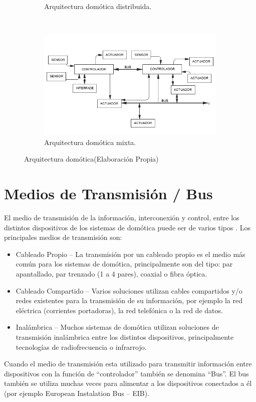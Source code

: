 \documentclass[11pt,letterpaper]{report}
\begin{document}
\begin{figure}
\begin{subfigure}[b]{0.5\textwidth}
        \caption{Arquitectura domótica distribuida. }
        \label{fig:distribuida}
    \end{subfigure}
     ~ %
    \begin{subfigure}[b]{0.5\textwidth}
        \includegraphics[width=\textwidth]{imagenes/MIXTA_.jpg}
        \caption{Arquitectura domótica mixta. }
        \label{fig:mixta}
    \end{subfigure}
    \caption{Arquitectura domótica(Elaboración Propia)}\label{fig:shelter}
\end{figure}
		\section{Medios de Transmisión / Bus}
		El medio de transmisión de la información, interconexión y control, entre los distintos dispositivos de los sistemas de domótica puede ser de varios tipos \citep{casadomo:2017:Misc}. Los principales medios de transmisión son: 
		\begin{itemize}
		\item Cableado Propio – La transmisión por un cableado propio es el medio más común para los sistemas de domótica, principalmente son del tipo: par apantallado, par trenzado (1 a 4 pares), coaxial o fibra óptica.
		\item Cableado Compartido – Varios soluciones utilizan cables compartidos y/o redes existentes para la transmisión de su información, por ejemplo la red eléctrica (corrientes portadoras), la red telefónica o la red de datos.  
		\item Inalámbrica – Muchos sistemas de domótica utilizan soluciones de transmisión inalámbrica entre los distintos dispositivos, principalmente tecnologías de radiofrecuencia o infrarrojo. 
		\end{itemize}
		Cuando el medio de transmisión esta utilizado para transmitir información entre dispositivos con la función de “controlador” también se denomina “Bus”. El bus también se utiliza muchas veces para alimentar a los dispositivos conectados a él (por ejemplo European Instalation Bus – EIB). 
\end{document}
